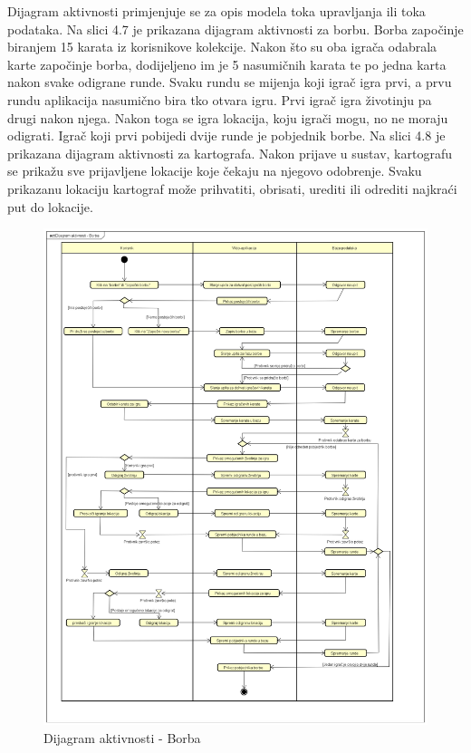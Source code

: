 \begin{itemize}
		Dijagram aktivnosti primjenjuje se za opis modela toka upravljanja ili toka podataka. Na slici 4.7 je prikazana dijagram aktivnosti za borbu. Borba započinje biranjem 15 karata iz korisnikove kolekcije. Nakon što su oba igrača odabrala karte započinje borba, dodijeljeno im je 5 nasumičnih karata te po jedna karta nakon svake odigrane runde. Svaku rundu se mijenja koji igrač igra prvi, a prvu rundu aplikacija nasumično bira tko otvara igru. Prvi igrač igra životinju pa drugi nakon njega. Nakon toga se igra lokacija, koju igrači mogu, no ne moraju odigrati. Igrač koji prvi pobijedi dvije runde je pobjednik borbe. Na slici 4.8 je prikazana dijagram aktivnosti za kartografa. Nakon prijave u sustav, kartografu se prikažu sve prijavljene lokacije koje čekaju na njegovo odobrenje. Svaku prikazanu lokaciju kartograf može prihvatiti, obrisati, urediti ili odrediti najkraći put do lokacije.
		\begin{figure}[H]
			\includegraphics[width=\textwidth]{slike/Dijagram_aktivnosti_-_Borba.png}
			\centering
			\caption{Dijagram aktivnosti - Borba}

\end{figure}
\end{itemize}
